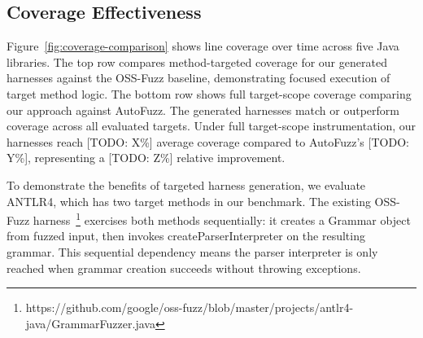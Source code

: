 \subsection{Coverage Effectiveness}%
\label{subsec:coverage-effectiveness}



Figure~\ref{fig:coverage-comparison} shows line coverage over time across five Java libraries. The top row compares method-targeted coverage for our generated harnesses against the OSS-Fuzz baseline, demonstrating focused execution of target method logic. The bottom row shows full target-scope coverage comparing our approach against AutoFuzz.
The generated harnesses match or outperform coverage across all evaluated targets. Under full target-scope instrumentation, our harnesses reach [TODO: X\%] average coverage compared to AutoFuzz's [TODO: Y\%], representing a [TODO: Z\%] relative improvement.
%
%
%
\par

To demonstrate the benefits of targeted harness generation, we evaluate ANTLR4, which has two target methods in our benchmark. The existing OSS-Fuzz harness~\footnote{https://github.com/google/oss-fuzz/blob/master/projects/antlr4-java/GrammarFuzzer.java} exercises both methods sequentially: it creates a Grammar object from fuzzed input, then invokes createParserInterpreter on the resulting grammar. This sequential dependency means the parser interpreter is only reached when grammar creation succeeds without throwing exceptions.
